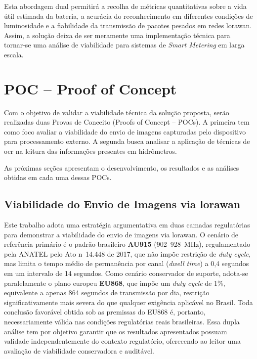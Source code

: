 Esta abordagem dual permitirá a recolha de métricas quantitativas sobre a vida útil estimada da bateria, a acurácia do reconhecimento em diferentes condições de luminosidade e a fiabilidade da transmissão de pacotes pesados em redes \gls{lorawan}. Assim, a solução deixa de ser meramente uma implementação técnica para tornar-se uma análise de viabilidade para sistemas de \textit{Smart Metering} em larga escala.

\section{POC -- Proof of Concept}

Com o objetivo de validar a viabilidade técnica da solução proposta, serão realizadas duas Provas de Conceito (Proofs of Concept -- POCs). A primeira tem como foco avaliar a viabilidade do envio de imagens capturadas pelo dispositivo para processamento externo. A segunda busca analisar a aplicação de técnicas de \gls{ocr} na leitura das informações presentes em hidrômetros.

As próximas seções apresentam o desenvolvimento, os resultados e as análises obtidas em cada uma dessas POCs.

\subsection{Viabilidade do Envio de Imagens via \gls{lorawan}}

Este trabalho adota uma estratégia argumentativa em duas camadas 
regulatórias para demonstrar a viabilidade do envio de imagens via 
\gls{lorawan}. O cenário de referência primário é o padrão brasileiro 
\textbf{AU915} (902--928~MHz), regulamentado pela ANATEL pelo Ato 
n\textordmasculine~14.448 de 2017, que não impõe restrição de 
\textit{duty cycle}, mas limita o tempo médio de permanência por 
canal (\textit{dwell time}) a 0,4 segundos em um intervalo de 14 
segundos. Como cenário conservador de suporte, adota-se 
paralelamente o plano europeu \textbf{EU868}, que impõe um 
\textit{duty cycle} de 1\%, equivalente a apenas 864 segundos de 
transmissão por dia, restrição significativamente mais severa do 
que qualquer exigência aplicável no Brasil. Toda conclusão favorável 
obtida sob as premissas do EU868 é, portanto, necessariamente válida 
nas condições regulatórias reais brasileiras. Essa dupla análise tem 
por objetivo garantir que os resultados apresentados possuam validade 
independentemente do contexto regulatório, oferecendo ao leitor uma 
avaliação de viabilidade conservadora e auditável.
 
